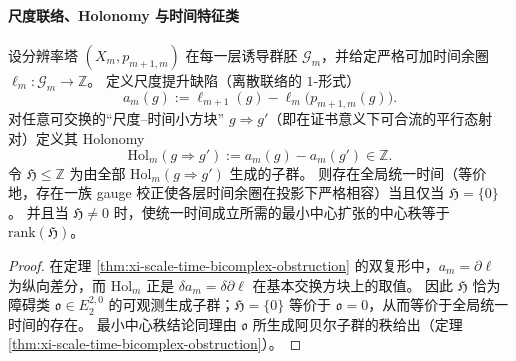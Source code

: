 \paragraph{尺度联络、Holonomy 与时间特征类}

\begin{theorem}\label{thm:xi-scale-time-connection-holonomy-criterion}
设分辨率塔 \((X_m,p_{m+1,m})\) 在每一层诱导群胚 \(\mathcal G_m\)，并给定严格可加时间余圈 \(\ell_m:\mathcal G_m\to\mathbb Z\)。
定义尺度提升缺陷（离散联络的 \(1\)-形式）
\[
a_m(g):=\ell_{m+1}(g)-\ell_m\!\bigl(p_{m+1,m}(g)\bigr).
\]
对任意可交换的“尺度--时间小方块” \(g\Rightarrow g'\)（即在证书意义下可合流的平行态射对）定义其 Holonomy
\[
\mathrm{Hol}_m(g\Rightarrow g'):=a_m(g)-a_m(g')\in\mathbb Z.
\]
令 \(\mathfrak H\le \mathbb Z\) 为由全部 \(\mathrm{Hol}_m(g\Rightarrow g')\) 生成的子群。
则存在全局统一时间（等价地，存在一族 gauge 校正使各层时间余圈在投影下严格相容）当且仅当 \(\mathfrak H=\{0\}\)。
并且当 \(\mathfrak H\neq 0\) 时，使统一时间成立所需的最小中心扩张的中心秩等于 \(\mathrm{rank}(\mathfrak H)\)。
\end{theorem}

\begin{proof}
在定理 \ref{thm:xi-scale-time-bicomplex-obstruction} 的双复形中，\(a_m=\partial\ell\) 为纵向差分，而 \(\mathrm{Hol}_m\) 正是 \(\delta a_m=\delta\partial\ell\) 在基本交换方块上的取值。
因此 \(\mathfrak H\) 恰为障碍类 \(\mathfrak o\in E_2^{2,0}\) 的可观测生成子群；\(\mathfrak H=\{0\}\) 等价于 \(\mathfrak o=0\)，从而等价于全局统一时间的存在。
最小中心秩结论同理由 \(\mathfrak o\) 所生成阿贝尔子群的秩给出（定理 \ref{thm:xi-scale-time-bicomplex-obstruction}）。
\end{proof}

